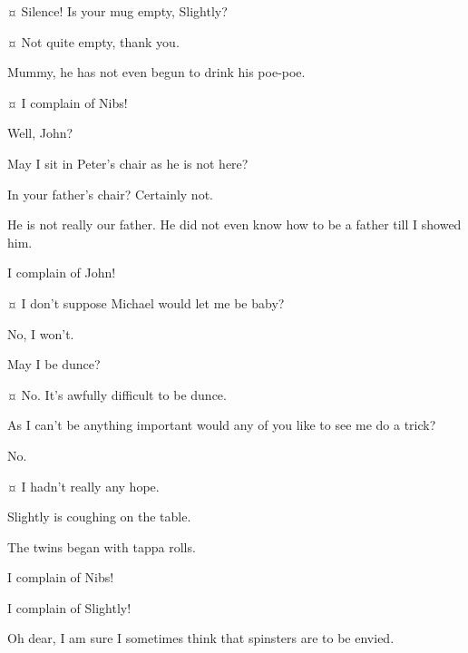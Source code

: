 \begin{drama}

\wendyspeaks {}¤
Silence!
Is your mug empty, Slightly?

\slightlyspeaks {}¤
Not quite empty, thank you.

\nibsspeaks
Mummy, he has not even begun to drink his poe‐poe.

\slightlyspeaks {}¤
I complain of Nibs!


\wendyspeaks
Well, John?

\johnspeaks
May I sit in Peter’s chair as he is not here?

\wendyspeaks
In your father’s chair?
Certainly not.

\johnspeaks
He is not really our father.
He did not even know how to be a father till I showed him.


\secondtwinspeaks
I complain of John!


\tootlesspeaks {}¤
I don’t suppose Michael would let me be baby?

\michaelspeaks
No, I won’t.

\tootlesspeaks
May I be dunce?

\firsttwinspeaks {}¤
No.
It’s awfully difficult to be dunce.

\tootlesspeaks
As I can’t be anything important would any of you like to see me do a trick?

No.

\tootlesspeaks {}¤
I hadn’t really any hope.


\nibsspeaks
Slightly is coughing on the table.

\curlyspeaks
The twins began with tappa rolls.

\slightlyspeaks
I complain of Nibs!

\nibsspeaks
I complain of Slightly!

\wendyspeaks
Oh dear, I am sure I sometimes think that spinsters are to be envied.


\end{drama}
